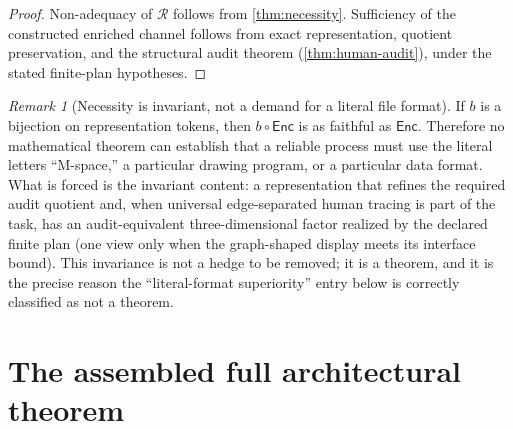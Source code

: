 \documentclass[11pt]{article}
\newcommand{\Enc}{\mathsf{Enc}}
\theoremstyle{plain}
\theoremstyle{definition}
\theoremstyle{remark}
\newtheorem{remark}[theorem]{Remark}
\begin{document}
\begin{proof}
Non-adequacy of $\mathcal R$ follows from \cref{thm:necessity}.  Sufficiency of the constructed enriched channel follows from exact
representation, quotient preservation, and the structural audit theorem
(\cref{thm:human-audit}), under the stated finite-plan hypotheses.
\end{proof}

\begin{remark}[Necessity is invariant, not a demand for a literal file format]
\label{rem:equivnecessity}
If $b$ is a bijection on representation tokens, then $b\circ\Enc$ is as faithful as $\Enc$.  Therefore no mathematical theorem can establish that a reliable process must use the literal letters ``M-space,'' a particular drawing program, or a particular data format.  What is forced is the invariant content: a representation that refines the
required audit quotient and, when universal edge-separated human tracing is part
of the task, has an audit-equivalent three-dimensional factor realized by the
declared finite plan (one view only when the graph-shaped display meets its
interface bound).  This invariance is not a hedge to be removed; it is a
theorem, and it is the precise reason the ``literal-format superiority'' entry
below is correctly classified as not a theorem.
\end{remark}

\section{The assembled full architectural theorem}
\label{sec:assembled}
\end{document}
